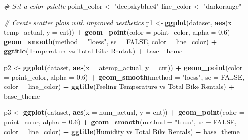 \documentclass[
]{article}
\newenvironment{Shaded}{\begin{snugshade}}{\end{snugshade}}
\newcommand{\AttributeTok}[1]{\textcolor[rgb]{0.13,0.29,0.53}{#1}}
\newcommand{\CommentTok}[1]{\textcolor[rgb]{0.56,0.35,0.01}{\textit{#1}}}
\newcommand{\ConstantTok}[1]{\textcolor[rgb]{0.56,0.35,0.01}{#1}}
\newcommand{\FloatTok}[1]{\textcolor[rgb]{0.00,0.00,0.81}{#1}}
\newcommand{\FunctionTok}[1]{\textcolor[rgb]{0.13,0.29,0.53}{\textbf{#1}}}
\newcommand{\NormalTok}[1]{#1}
\newcommand{\OtherTok}[1]{\textcolor[rgb]{0.56,0.35,0.01}{#1}}
\newcommand{\SpecialCharTok}[1]{\textcolor[rgb]{0.81,0.36,0.00}{\textbf{#1}}}
\newcommand{\StringTok}[1]{\textcolor[rgb]{0.31,0.60,0.02}{#1}}
\begin{document}
\begin{Shaded}
\begin{Highlighting}[]
\CommentTok{\# Set a color palette}
\NormalTok{point\_color }\OtherTok{\textless{}{-}} \StringTok{"deepskyblue4"}
\NormalTok{line\_color }\OtherTok{\textless{}{-}} \StringTok{"darkorange"}

\CommentTok{\# Create scatter plots with improved aesthetics}
\NormalTok{p1 }\OtherTok{\textless{}{-}} \FunctionTok{ggplot}\NormalTok{(dataset, }\FunctionTok{aes}\NormalTok{(}\AttributeTok{x =}\NormalTok{ temp\_actual, }\AttributeTok{y =}\NormalTok{ cnt)) }\SpecialCharTok{+} 
      \FunctionTok{geom\_point}\NormalTok{(}\AttributeTok{color =}\NormalTok{ point\_color, }\AttributeTok{alpha =} \FloatTok{0.6}\NormalTok{) }\SpecialCharTok{+} 
      \FunctionTok{geom\_smooth}\NormalTok{(}\AttributeTok{method =} \StringTok{"loess"}\NormalTok{, }\AttributeTok{se =} \ConstantTok{FALSE}\NormalTok{, }\AttributeTok{color =}\NormalTok{ line\_color) }\SpecialCharTok{+} 
      \FunctionTok{ggtitle}\NormalTok{(}\StringTok{\textquotesingle{}Temperature vs Total Bike Rentals\textquotesingle{}}\NormalTok{) }\SpecialCharTok{+}
\NormalTok{      base\_theme}

\NormalTok{p2 }\OtherTok{\textless{}{-}} \FunctionTok{ggplot}\NormalTok{(dataset, }\FunctionTok{aes}\NormalTok{(}\AttributeTok{x =}\NormalTok{ atemp\_actual, }\AttributeTok{y =}\NormalTok{ cnt)) }\SpecialCharTok{+} 
      \FunctionTok{geom\_point}\NormalTok{(}\AttributeTok{color =}\NormalTok{ point\_color, }\AttributeTok{alpha =} \FloatTok{0.6}\NormalTok{) }\SpecialCharTok{+} 
      \FunctionTok{geom\_smooth}\NormalTok{(}\AttributeTok{method =} \StringTok{"loess"}\NormalTok{, }\AttributeTok{se =} \ConstantTok{FALSE}\NormalTok{, }\AttributeTok{color =}\NormalTok{ line\_color) }\SpecialCharTok{+} 
      \FunctionTok{ggtitle}\NormalTok{(}\StringTok{\textquotesingle{}Feeling Temperature vs Total Bike Rentals\textquotesingle{}}\NormalTok{) }\SpecialCharTok{+}
\NormalTok{      base\_theme}

\NormalTok{p3 }\OtherTok{\textless{}{-}} \FunctionTok{ggplot}\NormalTok{(dataset, }\FunctionTok{aes}\NormalTok{(}\AttributeTok{x =}\NormalTok{ hum\_actual, }\AttributeTok{y =}\NormalTok{ cnt)) }\SpecialCharTok{+} 
      \FunctionTok{geom\_point}\NormalTok{(}\AttributeTok{color =}\NormalTok{ point\_color, }\AttributeTok{alpha =} \FloatTok{0.6}\NormalTok{) }\SpecialCharTok{+} 
      \FunctionTok{geom\_smooth}\NormalTok{(}\AttributeTok{method =} \StringTok{"loess"}\NormalTok{, }\AttributeTok{se =} \ConstantTok{FALSE}\NormalTok{, }\AttributeTok{color =}\NormalTok{ line\_color) }\SpecialCharTok{+} 
      \FunctionTok{ggtitle}\NormalTok{(}\StringTok{\textquotesingle{}Humidity vs Total Bike Rentals\textquotesingle{}}\NormalTok{) }\SpecialCharTok{+}
\NormalTok{      base\_theme}


\end{Highlighting}
\end{Shaded}
\end{document}
